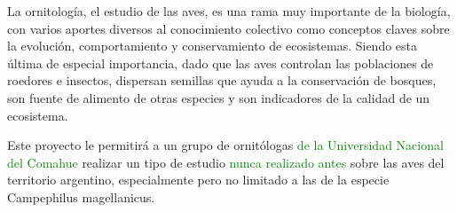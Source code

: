 La ornitología, el estudio de las aves, es una rama muy importante de la biología, con varios aportes diversos al conocimiento colectivo como conceptos claves sobre la evolución, comportamiento y conservamiento de ecosistemas. Siendo esta última de especial importancia, dado que las aves controlan las poblaciones de roedores e insectos, dispersan semillas que ayuda a la conservación de bosques, son fuente de alimento de otras especies y son indicadores de la calidad de un ecosistema.

Este proyecto le permitirá a un grupo de ornitólogas \textcolor{green}{de la Universidad Nacional del Comahue} realizar un tipo de estudio \textcolor{green}{nunca realizado antes} sobre las aves del territorio argentino, especialmente pero no limitado a las de la especie Campephilus magellanicus.